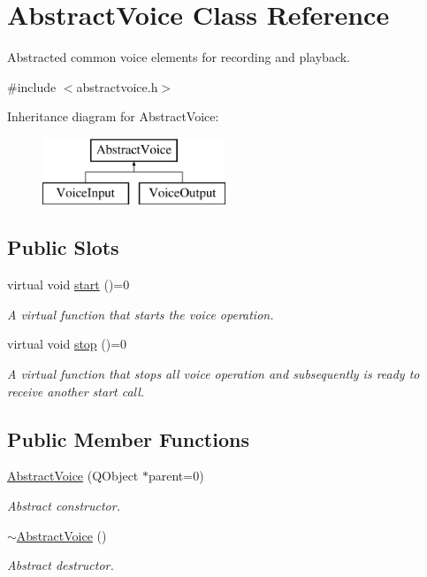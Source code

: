 \hypertarget{class_abstract_voice}{
\section{\-Abstract\-Voice \-Class \-Reference}
\label{class_abstract_voice}
}


\-Abstracted common voice elements for recording and playback.  




{\ttfamily \#include $<$abstractvoice.\-h$>$}

\-Inheritance diagram for \-Abstract\-Voice\-:\begin{figure}[H]
\begin{center}
\leavevmode
\includegraphics[height=2.000000cm]{class_abstract_voice}
\end{center}
\end{figure}
\subsection*{\-Public \-Slots}
\begin{DoxyCompactItemize}
\item 
virtual void \hyperlink{class_abstract_voice_a5e6f942915e9ef55babd7070225266ce}{start} ()=0
\begin{DoxyCompactList}\small\item\em \-A virtual function that starts the voice operation. \end{DoxyCompactList}\item 
virtual void \hyperlink{class_abstract_voice_aae2a6c918a63938881faefd9909508a0}{stop} ()=0
\begin{DoxyCompactList}\small\item\em \-A virtual function that stops all voice operation and subsequently is ready to receive another start call. \end{DoxyCompactList}\end{DoxyCompactItemize}
\subsection*{\-Public \-Member \-Functions}
\begin{DoxyCompactItemize}
\item 
\hyperlink{class_abstract_voice_a6b3c93369820d5e9e65f596dcf2147be}{\-Abstract\-Voice} (\-Q\-Object $\ast$parent=0)
\begin{DoxyCompactList}\small\item\em \-Abstract constructor. \end{DoxyCompactList}\item 
\hyperlink{class_abstract_voice_a93d6515cf6e84cad397efe6b339a1b0c}{$\sim$\-Abstract\-Voice} ()
\begin{DoxyCompactList}\small\item\em \-Abstract destructor. \end{DoxyCompactList}\end{DoxyCompactItemize}
